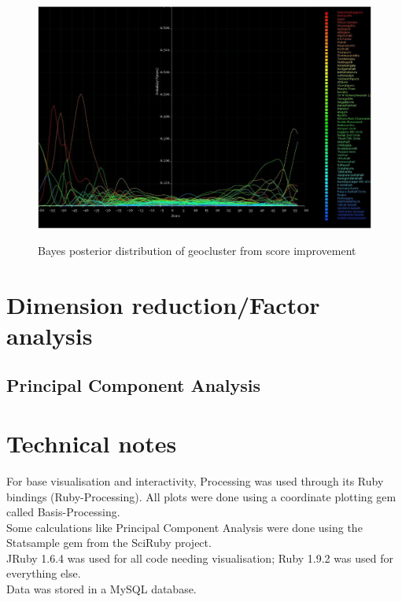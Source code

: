 \documentclass[10pt]{article}
\begin{document}
\newpage
\begin{figure}
\caption{Bayes posterior distribution of geocluster from score improvement}
\label{BayesClusterFromImprovement}
\begin{center}
\includegraphics[width=160mm]{ReportMedia/BayesClusterFromImprovement.jpg}\\
\end{center}
\end{figure}
\newpage
\section{Dimension reduction/Factor analysis}
\newpage
\subsection{Principal Component Analysis}

\newpage
\section{Technical notes}
For base visualisation and interactivity, Processing was used through its Ruby bindings (Ruby-Processing). All plots were done using a coordinate plotting gem called Basis-Processing.\\
Some calculations like Principal Component Analysis were done using the Statsample gem from the SciRuby project.\\
JRuby 1.6.4 was used for all code needing visualisation; Ruby 1.9.2 was used for everything else.\\
Data was stored in a MySQL database.
\end{document}

